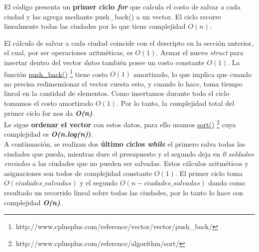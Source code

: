 
El c\'odigo presenta un \textbf{primer ciclo \emph{for}} que calcula el costo de salvar a cada ciudad y las agrega mediante push_back() a un vector. El ciclo recorre linealmente todas las ciudades por lo que tiene complejidad $O(n)$. 

El c\'alculo de salvar a cada ciudad coincide con el descripto en la secci\'on anterior, el cual, por ser operaciones aritm\'eticas, es $O(1)$. Armar el nuevo \emph{struct} para insertar dentro del vector \emph{datos} tambi\'en posee un costo constante $O(1)$. La funci\'on \href{http://www.cplusplus.com/reference/vector/vector/push_back/}{push\_back()} \footnote{http://www.cplusplus.com/reference/vector/vector/push_back/} tiene costo $O(1)$ amortizado, lo que implica que cuando no precisa redimensionar el vector cuesta esto, y cuando lo hace, toma tiempo lineal en la cantidad de elementos. Como insertamos durante todo el ciclo tomamos el costo amortizado $O(1)$.
Por lo tanto, la complejidad total del primer ciclo for nos da \textbf{\textit{O(n)}}.\\

Le sigue \textbf{ordenar el vector} con estos datos, para ello usamos \href{http://www.cplusplus.com/reference/algorithm/sort/}{sort()} \footnote{http://www.cplusplus.com/reference/algorithm/sort/} cuya complejidad es \textbf{\textit{O(n.log(n)})}.\\

A continuaci\'on, se realizan dos \textbf{\'ultimo ciclos \emph{while}} el primero salva todas las ciudades que pueda, mientras dure el presupuesto y el segundo deja en \emph{0 soldados enviados} a las ciudades que no pueden ser salvadas. Estos c\'alculos aritm\'eticos y asignaciones son todos de complejidad constante $O(1)$. El primer ciclo toma $O(ciudades\_salvadas)$ y el segundo $O(n-ciudades\_salvadas)$ dando como resultado un recorrido lineal sobre todas las ciudades, por lo tanto lo hace con complejidad \textbf{\textit{O(n)}}.\\



